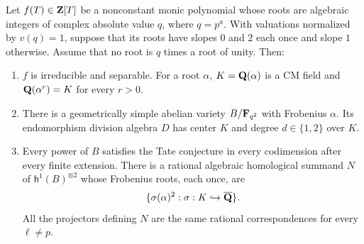 \begin{proposition}\label{prop:ordinary-packet}
Let $f(T)\in\mathbf Z[T]$ be a nonconstant monic polynomial whose roots
are algebraic integers of complex absolute value $q$, where
$q=p^a$. With valuations normalized by $v(q)=1$, suppose that its
roots have slopes $0$ and $2$ each once and slope $1$ otherwise.
Assume that no root is $q$ times a root of unity. Then:
\begin{enumerate}
\item $f$ is irreducible and separable. For a root $\alpha$,
$K=\mathbf Q(\alpha)$ is a CM field and $\mathbf Q(\alpha^r)=K$ for every $r>0$.
\item There is a geometrically simple abelian variety $B/\mathbf F_{q^2}$
with Frobenius $\alpha$. Its endomorphism division algebra $D$ has
center $K$ and degree $d\in\{1,2\}$ over $K$.
\item Every power of $B$ satisfies the Tate conjecture in every
codimension after every finite extension. There is a rational
algebraic homological summand $N$ of $\mathsf h^1(B)^{\otimes2}$
whose Frobenius roots, each once, are
\[
                  \{\sigma(\alpha)^2:\sigma:K\hookrightarrow\overline{\mathbf Q}\}.
\]
All the projectors defining $N$ are the same rational
correspondences for every $\ell\ne p$.
\end{enumerate}
\end{proposition}

